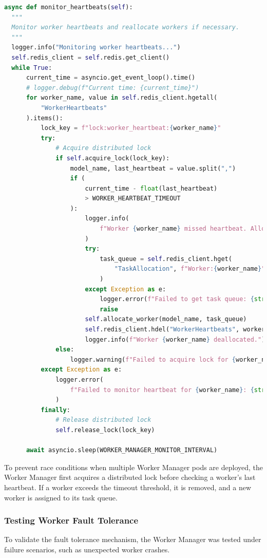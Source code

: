 \begin{lstlisting}[language=python, caption={Worker Fault Tolerance Mechanism}, label={lst:worker_fault_tolerance}]
async def monitor_heartbeats(self):
  """
  Monitor worker heartbeats and reallocate workers if necessary.
  """
  logger.info("Monitoring worker heartbeats...")
  self.redis_client = self.redis.get_client()
  while True:
      current_time = asyncio.get_event_loop().time()
      # logger.debug(f"Current time: {current_time}")
      for worker_name, value in self.redis_client.hgetall(
          "WorkerHeartbeats"
      ).items():
          lock_key = f"lock:worker_heartbeat:{worker_name}"
          try:
              # Acquire distributed lock
              if self.acquire_lock(lock_key):
                  model_name, last_heartbeat = value.split(",")
                  if (
                      current_time - float(last_heartbeat)
                      > WORKER_HEARTBEAT_TIMEOUT
                  ):
                      logger.info(
                          f"Worker {worker_name} missed heartbeat. Allocating new worker."
                      )
                      try:
                          task_queue = self.redis_client.hget(
                              "TaskAllocation", f"Worker:{worker_name}"
                          )
                      except Exception as e:
                          logger.error(f"Failed to get task queue: {str(e)}")
                          raise
                      self.allocate_worker(model_name, task_queue)
                      self.redis_client.hdel("WorkerHeartbeats", worker_name)
                      logger.info(f"Worker {worker_name} deallocated.")
              else:
                  logger.warning(f"Failed to acquire lock for {worker_name}")
          except Exception as e:
              logger.error(
                  f"Failed to monitor heartbeat for {worker_name}: {str(e)}"
              )
          finally:
              # Release distributed lock
              self.release_lock(lock_key)

      await asyncio.sleep(WORKER_MANAGER_MONITOR_INTERVAL)
\end{lstlisting}

To prevent race conditions when multiple Worker Manager pods are deployed, the Worker Manager first acquires a distributed lock before checking a worker’s last heartbeat. If a worker exceeds the timeout threshold, it is removed, and a new worker is assigned to its task queue.

\subsubsection{Testing Worker Fault Tolerance}
To validate the fault tolerance mechanism, the Worker Manager was tested under failure scenarios, such as unexpected worker crashes.

